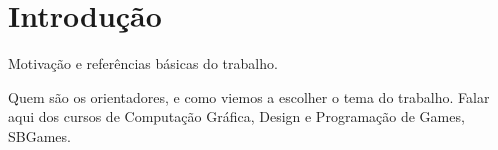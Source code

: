 \chapter{Introdução}


Motivação e referências básicas do trabalho.

Quem são os orientadores, e como viemos a escolher o tema do
trabalho. Falar aqui dos cursos de Computação Gráfica, Design e
Programação de Games, SBGames.


